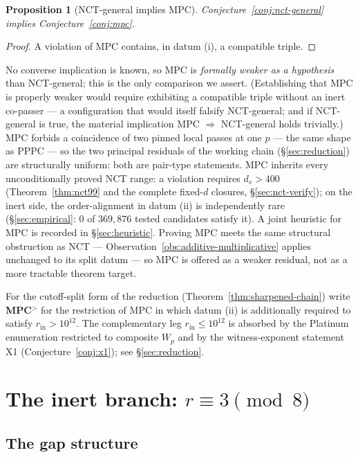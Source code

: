 \documentclass[11pt]{amsart}
\theoremstyle{plain}
\newtheorem{proposition}[theorem]{Proposition}
\theoremstyle{definition}
\theoremstyle{remark}
\numberwithin{equation}{section}
\begin{document}
\begin{proposition}[NCT-general implies MPC]\label{prop:nct-implies-mpc}
Conjecture~\ref{conj:nct-general} implies Conjecture~\ref{conj:mpc}.
\end{proposition}

\begin{proof}
A violation of MPC contains, in datum (i), a compatible triple.
\end{proof}

No converse implication is known, so MPC is \emph{formally weaker as a hypothesis} than NCT-general; this is the only comparison we assert. (Establishing that MPC is properly weaker would require exhibiting a compatible triple without an inert co-passer --- a configuration that would itself falsify NCT-general; and if NCT-general is true, the material implication MPC $\Rightarrow$ NCT-general holds trivially.) MPC forbids a coincidence of two pinned local passes at one $p$ --- the same shape as PPPC --- so the two principal residuals of the working chain (\S\ref{sec:reduction}) are structurally uniform: both are pair-type statements. MPC inherits every unconditionally proved NCT range: a violation requires $d_s > 400$ (Theorem~\ref{thm:nct99} and the complete fixed-$d$ closures, \S\ref{sec:nct-verify}); on the inert side, the order-alignment in datum (ii) is independently rare (\S\ref{sec:empirical}: $0$ of $369{,}876$ tested candidates satisfy it). A joint heuristic for MPC is recorded in \S\ref{sec:heuristic}. Proving MPC meets the same structural obstruction as NCT --- Observation~\ref{obs:additive-multiplicative} applies unchanged to its split datum --- so MPC is offered as a weaker residual, not as a more tractable theorem target.

For the cutoff-split form of the reduction (Theorem~\ref{thm:sharpened-chain}) write \textbf{MPC$^{>}$} for the restriction of MPC in which datum (ii) is additionally required to satisfy $r_{\mathrm{in}} > 10^{12}$. The complementary leg $r_{\mathrm{in}} \leq 10^{12}$ is absorbed by the Platinum enumeration restricted to composite $W_p$ and by the witness-exponent statement X1 (Conjecture~\ref{conj:x1}); see \S\ref{sec:reduction}.

\section{The inert branch: \texorpdfstring{$r \equiv 3 \pmod 8$}{r = 3 mod 8}}\label{sec:inert}

\subsection{The gap structure}\label{sec:gap-structure}
\end{document}
